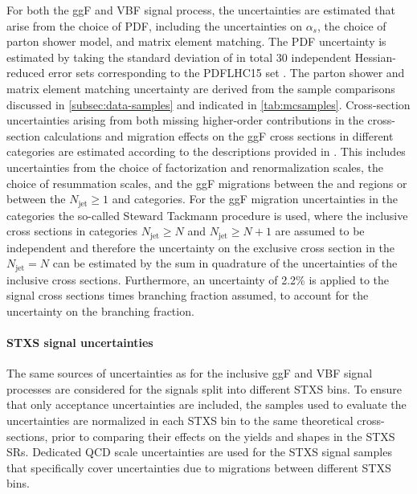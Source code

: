 For both the ggF and VBF signal process, the uncertainties are estimated that arise from the choice of PDF, including the uncertainties on $\alpha_s$, the choice of parton shower model, and matrix element matching.
The PDF uncertainty is estimated by taking the standard deviation of in total 30 independent Hessian-reduced error sets corresponding to the PDFLHC15 set \cite{Butterworth:2015oua}. 
The parton shower and matrix element matching uncertainty are derived from the sample comparisons discussed in \cref{subsec:data-samples} and indicated in \cref{tab:mcsamples}.
Cross-section uncertainties arising from both missing higher-order contributions in the cross-section calculations and migration effects on the ggF cross sections in different \Njets categories are estimated according to the descriptions provided in .
This includes uncertainties from the choice of factorization and renormalization scales, the choice of resummation scales, and the ggF migrations between the \ZeroJet and \OneJet regions or between the $N_{\text{jet}} \ge 1$  and \TwoJet categories.
For the ggF migration uncertainties in the \TwoJet categories the so-called Steward Tackmann procedure is used, where the inclusive cross sections in categories $N_{\text{jet}} \ge N$ and $N_{\text{jet}} \ge N+1$ are assumed to be independent and therefore the uncertainty on the exclusive cross section in the $N_{\text{jet}} = N$ can be estimated by the sum in quadrature of the uncertainties of the inclusive cross sections.
Furthermore, an uncertainty of 2.2\% is applied to the signal cross sections times branching fraction assumed, to account for the uncertainty on the \HWW branching fraction. 

\paragraph{STXS signal uncertainties}
The same sources of uncertainties as for the inclusive ggF and VBF signal processes are considered for the signals split into different STXS bins. 
To ensure that only acceptance uncertainties are included, the samples used to evaluate the uncertainties are normalized in each STXS bin to the same theoretical cross-sections, prior to comparing their effects on the yields and shapes in the STXS SRs. 
Dedicated QCD scale uncertainties are used for the STXS signal samples that specifically cover uncertainties due to migrations between different STXS bins. 

